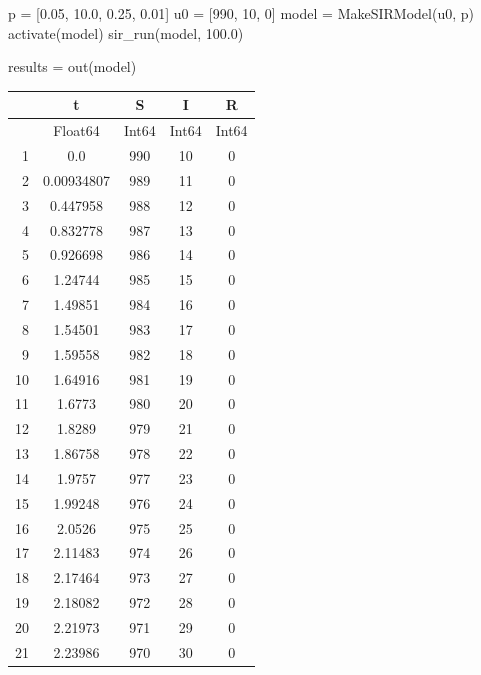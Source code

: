 \documentclass[
  12pt,
  a4paper,
  DIV=11,
  numbers=noendperiod]{scrreprt}
\newenvironment{Shaded}{\begin{snugshade}}{\end{snugshade}}
\newcommand{\FloatTok}[1]{\textcolor[rgb]{0.68,0.00,0.00}{#1}}
\newcommand{\FunctionTok}[1]{\textcolor[rgb]{0.28,0.35,0.67}{#1}}
\newcommand{\NormalTok}[1]{\textcolor[rgb]{0.00,0.23,0.31}{#1}}
\newcommand{\OperatorTok}[1]{\textcolor[rgb]{0.37,0.37,0.37}{#1}}
\begin{document}
\begin{Shaded}
\begin{Highlighting}[]
\NormalTok{p }\OperatorTok{=}\NormalTok{ [}\FloatTok{0.05}\NormalTok{, }\FloatTok{10.0}\NormalTok{, }\FloatTok{0.25}\NormalTok{, }\FloatTok{0.01}\NormalTok{]}
\NormalTok{u0 }\OperatorTok{=}\NormalTok{ [}\FloatTok{990}\NormalTok{, }\FloatTok{10}\NormalTok{, }\FloatTok{0}\NormalTok{]}
\NormalTok{model }\OperatorTok{=} \FunctionTok{MakeSIRModel}\NormalTok{(u0, p)}
\FunctionTok{activate}\NormalTok{(model)}
\FunctionTok{sir\_run}\NormalTok{(model, }\FloatTok{100.0}\NormalTok{)}

\NormalTok{results }\OperatorTok{=} \FunctionTok{out}\NormalTok{(model)}
\end{Highlighting}
\end{Shaded}

\begin{tabular}{r|cccc}
    & t & S & I & R\\
    \hline
    & Float64 & Int64 & Int64 & Int64\\
    \hline
    1 & 0.0 & 990 & 10 & 0 \\
    2 & 0.00934807 & 989 & 11 & 0 \\
    3 & 0.447958 & 988 & 12 & 0 \\
    4 & 0.832778 & 987 & 13 & 0 \\
    5 & 0.926698 & 986 & 14 & 0 \\
    6 & 1.24744 & 985 & 15 & 0 \\
    7 & 1.49851 & 984 & 16 & 0 \\
    8 & 1.54501 & 983 & 17 & 0 \\
    9 & 1.59558 & 982 & 18 & 0 \\
    10 & 1.64916 & 981 & 19 & 0 \\
    11 & 1.6773 & 980 & 20 & 0 \\
    12 & 1.8289 & 979 & 21 & 0 \\
    13 & 1.86758 & 978 & 22 & 0 \\
    14 & 1.9757 & 977 & 23 & 0 \\
    15 & 1.99248 & 976 & 24 & 0 \\
    16 & 2.0526 & 975 & 25 & 0 \\
    17 & 2.11483 & 974 & 26 & 0 \\
    18 & 2.17464 & 973 & 27 & 0 \\
    19 & 2.18082 & 972 & 28 & 0 \\
    20 & 2.21973 & 971 & 29 & 0 \\
    21 & 2.23986 & 970 & 30 & 0 \\

\end{tabular}
\end{document}
